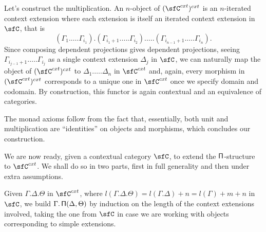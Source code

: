 \begin{construction}
  Let's construct the multiplication. An $n$-object of $(\sfC^{cxt})^{cxt}$ is an
  $n$-iterated context extension where each extension is itself an iterated
  context extension in $\sfC$, that is
  \[(\Gamma_1.\ldots.\Gamma_{i_1}).(\Gamma_{i_1+1}.\ldots.\Gamma_{i_2}).\ldots.(\Gamma_{i_{n-1}+1}.\ldots.\Gamma_{i_n}).\]
  Since composing dependent projections gives dependent projections,
  seeing $\Gamma_{i_{j-1}+1}.\ldots.\Gamma_{i_j}$ as a single context extension
  $\Delta_j$ in $\sfC$, we can naturally
  map the object of $(\sfC^{cxt})^{cxt}$ to $\Delta_1.\ldots.\Delta_n$ in
  $\sfC^{cxt}$ and, again, every morphism
  in $(\sfC^{cxt})^{cxt}$ corresponds to a unique one in $\sfC^{cxt}$ once we
  specify domain and codomain. By construction, this functor is again contextual
  and an equivalence of categories.

  The monad axioms follow from the fact that, essentially, both unit and
  multiplication are ``identities'' on objects and morphisms, which concludes
  our construction.
\end{construction}

We are now ready, given a contextual category $\sfC$, to extend the
$\operatorname{\mathsf{\Pi}}$-structure to $\sfC^{cxt}$. We shall do so in two parts, first in full
generality and then under extra assumptions.

Given $\Gamma.\Delta.\Theta$ in $\sfC^{cxt}$, where
$l(\Gamma.\Delta.\Theta)=l(\Gamma.\Delta)+n=l(\Gamma)+m+n$ in $\sfC$, we
build $\Gamma.\operatorname{\mathsf{\Pi}}(\Delta,\Theta)$ by induction on the length of the context
extensions involved, taking the
one from $\sfC$ in case we are working with objects corresponding to simple
extensions.


